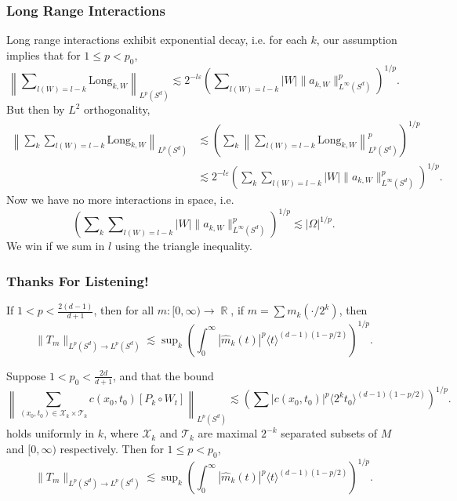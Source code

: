 \documentclass[usenames,dvipsnames,10pt]{beamer}
\DeclareMathOperator{\RR}{\mathbb{R}}
\begin{document}
\begin{frame}
    \frametitle{Long Range Interactions}

    Long range interactions exhibit exponential decay, i.e. for each $k$, our assumption implies that for $1 \leq p < p_0$,
    \[ \left\| \sum\nolimits_{l(W) = l - k} \text{Long}_{k,W} \right\|_{L^p(S^d)} \lesssim 2^{-l \varepsilon} \left( \sum\nolimits_{l(W) = l-k} |W| \| a_{k,W} \|_{L^\infty(S^d)}^p \right)^{1/p}. \]
    \pause
    But then by $L^2$ orthogonality,
    \small
    \begin{align*}
        \left\| \sum\nolimits_k \sum\nolimits_{l(W) = l - k} \text{Long}_{k,W} \right\|_{L^p(S^d)} &\lesssim \left( \sum\nolimits_k \left\| \sum\nolimits_{l(W) = l-k} \text{Long}_{k,W} \right\|_{L^p(S^d)}^p \right)^{1/p}\\
        &\lesssim 2^{-l \varepsilon} \left( \sum\nolimits_k \sum\nolimits_{l(W) = l - k} |W| \| a_{k,W} \|_{L^\infty(S^d)}^p \right)^{1/p}.
    \end{align*}
    \normalsize
    Now we have no more interactions in space, i.e.
    \[ \left( \sum\nolimits_k \sum\nolimits_{l(W) = l - k} |W| \| a_{k,W} \|_{L^\infty(S^d)}^p \right)^{1/p} \lesssim |\Omega|^{1/p}. \]
    \pause 
    We win if we sum in $l$ using the triangle inequality.
\end{frame}


\begin{frame}
    \frametitle{Thanks For Listening!}

    \small
    \begin{theorem}
        If $1 < p < \frac{2(d-1)}{d+1}$, then for all $m: [0,\infty) \to \RR$, if $m = \sum m_k(\cdot/2^k)$, then
        \[ \| T_m \|_{L^p(S^d) \to L^p(S^d)} \lesssim \sup\nolimits_k \left( \int_0^\infty |\widehat{m}_k(t)|^p \langle t \rangle^{(d-1)(1 - p/2)} \right)^{1/p}. \]
    \end{theorem}

    \begin{theorem}
        Suppose $1 < p_0 < \frac{2d}{d+1}$, and that the bound
        \[ \left\| \sum_{(x_0,t_0) \in \mathcal{X}_k \times \mathcal{T}_k} c(x_0,t_0) [P_k \circ W_t] \right\|_{L^p(S^d)} \lesssim \left( \sum |c(x_0,t_0)|^p \langle 2^k t_0 \rangle^{(d-1)(1 - p/2)} \right)^{1/p}. \]
        holds uniformly in $k$, where $\mathcal{X}_k$ and $\mathcal{T}_k$ are maximal $2^{-k}$ separated subsets of $M$ and $[0,\infty)$ respectively. Then for $1 \leq p < p_0$,
        \[ \| T_m \|_{L^p(S^d) \to L^p(S^d)} \lesssim \sup\nolimits_k \left( \int_0^\infty |\widehat{m}_k(t)|^p \langle t \rangle^{(d-1)(1 - p/2)} \right)^{1/p}. \]
    \end{theorem}
    \normalsize
\end{frame}
\end{document}
